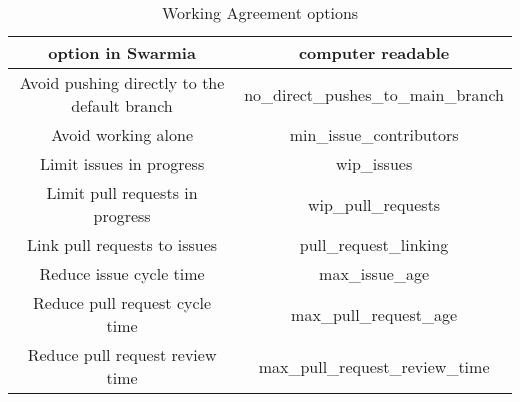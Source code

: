 \begin{table}[h!]
\centering
\begin{tabular}{ |c|c| } 
\hline
option in Swarmia & computer readable \\ [0.5ex] 
\hline\hline
Avoid pushing directly to the default branch & no\_direct\_pushes\_to\_main\_branch \\
Avoid working alone & min\_issue\_contributors  \\
Limit issues in progress & wip\_issues  \\
Limit pull requests in progress & wip\_pull\_requests \\
Link pull requests to issues & pull\_request\_linking  \\
Reduce issue cycle time & max\_issue\_age  \\
Reduce pull request cycle time & max\_pull\_request\_age \\
Reduce pull request review time & max\_pull\_request\_review\_time  \\
\hline
\end{tabular}
\caption{Working Agreement options}
\label{tab:workingAgreements}
\end{table}